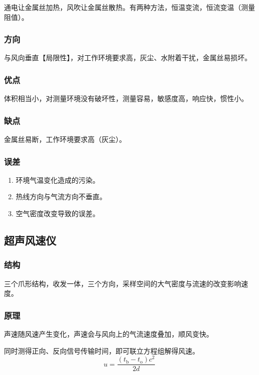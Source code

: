 \documentclass[UTF8,11pt]{ctexbook}
\begin{document}
通电让金属丝加热，风吹让金属丝散热。有两种方法，恒温变流，恒流变温（测量阻值）。

\subsubsection{方向}

与风向垂直【局限性】，对工作环境要求高，灰尘、水附着干扰，金属丝易损坏。

\subsubsection{优点}

体积相当小，对测量环境没有破坏性，测量容易，敏感度高，响应快，惯性小。

\subsubsection{缺点}

金属丝易断，工作环境要求高（灰尘）。

\subsubsection{误差}
\begin{enumerate}
    \item 环境气温变化造成的污染。
    \item 热线方向与气流方向不垂直。
    \item 空气密度改变导致的误差。
\end{enumerate}

\subsection{超声风速仪}

\subsubsection{结构}

三个爪形结构，收发一体，三个方向，采样空间的大气密度与流速的改变影响速度。

\subsubsection{原理}

声速随风速产生变化，声速会与风向上的气流速度叠加，顺风变快。

同时测得正向、反向信号传输时间，即可联立方程组解得风速。
\[
u=\frac{(t_\mathrm{b}-t_\mathrm{o})c^2}{2d}
\]
\end{document}
